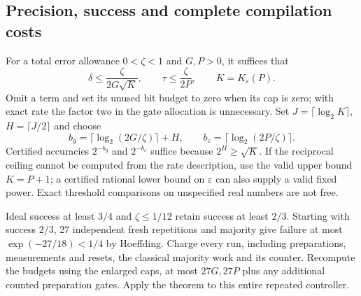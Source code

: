\documentclass[11pt]{article}
\theoremstyle{remark}
\newcommand{\eps}{\varepsilon}
\begin{document}
\subsection{Precision, success and complete compilation costs}
For a total error allowance $0<\zeta<1$ and $G,P>0$, it suffices that
\begin{equation}\label{eq:precision-budget}
 \delta\le\frac{\zeta}{2G\sqrt K},\qquad
 \tau\le\frac{\zeta}{2P},\qquad K=K_\eps(P).
\end{equation}
Omit a term and set its unused bit budget to zero when its cap is zero;
with exact rate the factor two in the
gate allocation is unnecessary. Set $J=\lceil\log_2 K\rceil$,
$H=\lceil J/2\rceil$ and choose
\[
 b_g=\lceil\log_2(2G/\zeta)\rceil+H,\qquad
 b_\eps=\lceil\log_2(2P/\zeta)\rceil.
\]
Certified accuracies $2^{-b_g}$ and $2^{-b_\eps}$ suffice because
$2^H\ge\sqrt K$. If the reciprocal ceiling cannot be computed from
the rate description, use the valid upper bound $K=P+1$; a certified
rational lower bound on $\eps$ can also supply a valid fixed power.
Exact threshold comparisons on unspecified real numbers are not free.

Ideal success at least $3/4$ and $\zeta\le1/12$ retain success at least
$2/3$. Starting with success $2/3$, 27 independent fresh repetitions
and majority give failure at most $\exp(-27/18)<1/4$ by Hoeffding.
Charge every run, including preparations, measurements and resets,
the classical majority work and its counter. Recompute the budgets using
the enlarged caps, at most $27G,27P$ plus any additional counted
preparation gates. Apply the theorem to this entire repeated controller.
\end{document}
